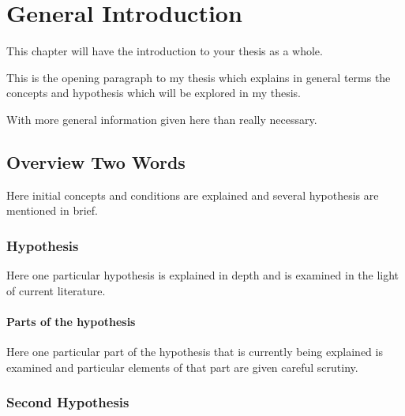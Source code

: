 \chapter{General Introduction}

This chapter will have the introduction to your thesis as a whole.

This is the opening paragraph to my thesis which
explains in general terms the concepts and hypothesis
which will be explored in my thesis.

With more general information given here than really
necessary.

\section{Overview Two Words}

Here initial concepts and conditions are explained and
several hypothesis are mentioned in brief.

\subsection{Hypothesis}

Here one particular hypothesis is explained in depth
and is examined in the light of current literature.

\subsubsection{Parts of the hypothesis}

Here one particular part of the hypothesis that is
currently being explained is examined and particular
elements of that part are given careful scrutiny.


\subsection{Second Hypothesis}

